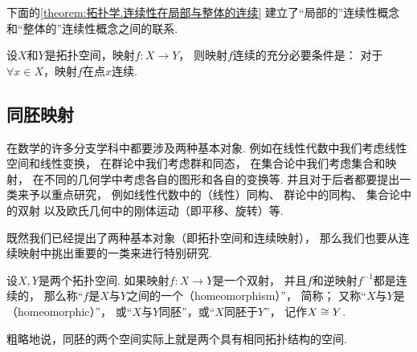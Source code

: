 下面的\cref{theorem:拓扑学.连续性在局部与整体的连续}
建立了“局部的”连续性概念和“整体的”连续性概念之间的联系.

\begin{theorem}\label{theorem:拓扑学.连续性在局部与整体的连续}
设\(X\)和\(Y\)是拓扑空间，映射\(f\colon X \to Y\)，
则映射\(f\)连续的充分必要条件是：
对于\(\forall x \in X\)，映射\(f\)在点\(x\)连续.
\end{theorem}

\subsection{同胚映射}
在数学的许多分支学科中都要涉及两种基本对象.
例如在线性代数中我们考虑线性空间和线性变换，
在群论中我们考虑群和同态，
在集合论中我们考虑集合和映射，
在不同的几何学中考虑各自的图形和各自的变换等.
并且对于后者都要提出一类来予以重点研究，
例如线性代数中的（线性）同构、
群论中的同构、
集合论中的双射
以及欧氏几何中的刚体运动（即平移、旋转）等.

既然我们已经提出了两种基本对象（即拓扑空间和连续映射），
那么我们也要从连续映射中挑出重要的一类来进行特别研究.

\begin{definition}\label{definition:拓扑学.同胚映射的概念}
设\(X,Y\)是两个拓扑空间.
如果映射\(f\colon X \to Y\)是一个双射，
并且\(f\)和逆映射\(f^{-1}\)都是连续的，
那么称“\(f\)是\(X\)与\(Y\)之间的一个（homeomorphism）”，
简称；
又称“\(X\)与\(Y\)是（homeomorphic）”，
或“\(X\)与\(Y\)同胚”，或“\(X\)同胚于\(Y\)”，
记作\(X \cong Y\).
\end{definition}

粗略地说，同胚的两个空间实际上就是两个具有相同拓扑结构的空间.

